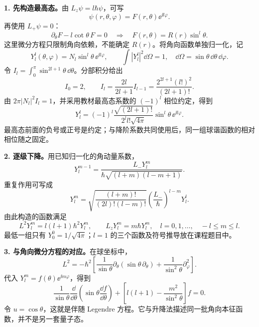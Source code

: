 \textbf{1. 先构造最高态。}由 $L_z\psi=l\hbar\psi$，可写
\begin{equation}
  \psi(r,\theta,\varphi)=F(r,\theta)\ee^{\ii l\varphi}.
\end{equation}
再使用 $L_+\psi=0$：
\begin{equation}
  \partial_\theta F-l\cot\theta\,F=0
  \quad\Longrightarrow\quad F(r,\theta)=R(r)\sin^l\theta.
\end{equation}
这里微分方程只限制角向依赖，不能确定 $R(r)$。将角向函数单独归一化，记
\begin{equation}
  Y_l^l(\theta,\varphi)=N_l\sin^l\theta\,\ee^{\ii l\varphi},
  \qquad \int |Y_l^l|^2\dd\Omega=1,
  \quad \dd\Omega=\sin\theta\,\dd\theta\,\dd\varphi.
\end{equation}
令 $I_l=\int_0^\pi\sin^{2l+1}\theta\,\dd\theta$。分部积分给出
\begin{equation}
  I_0=2,\qquad I_l=\frac{2l}{2l+1}I_{l-1}
    =\frac{2^{2l+1}(l!)^2}{(2l+1)!}.
\end{equation}
由 $2\pi|N_l|^2I_l=1$，并采用教材最高态系数的 $(-1)^l$ 相位约定，得到
\begin{equation}
  \boxed{Y_l^l
    =(-1)^l\frac{\sqrt{(2l+1)!}}{2^l l!\sqrt{4\pi}}
       \sin^l\theta\,\ee^{\ii l\varphi}.}
\end{equation}
最高态前面的负号或正号是约定；与降阶系数共同使用后，同一组球谐函数的相对相位随之固定。

\textbf{2. 逐级下降。}用已知归一化的角动量系数，
\begin{equation}
  Y_l^{m-1}
    =\frac{L_-Y_l^m}{\hbar\sqrt{(l+m)(l-m+1)}}.
\end{equation}
重复作用可写成
\begin{equation}
  \boxed{Y_l^m
    =\sqrt{\frac{(l+m)!}{(2l)!(l-m)!}}
       \left(\frac{L_-}{\hbar}\right)^{l-m}Y_l^l.}
\end{equation}
由此构造的函数满足
\begin{equation}
  L^2Y_l^m=l(l+1)\hbar^2Y_l^m,\qquad
  L_zY_l^m=m\hbar Y_l^m,
  \quad l=0,1,\ldots,\quad -l\leq m\leq l.
\end{equation}
最低一组只有 $Y_0^0=1/\sqrt{4\pi}$；$l=1$ 的三个函数及符号推导放在课程题目中。

\textbf{3. 与角向微分方程的对应。}在球坐标中，
\begin{equation}
  \boxed{L^2=-\hbar^2\left[
    \frac1{\sin\theta}\partial_\theta(\sin\theta\,\partial_\theta)
    +\frac1{\sin^2\theta}\partial_\varphi^2\right].}
\end{equation}
代入 $Y_l^m=f(\theta)\ee^{\ii m\varphi}$，得到
\begin{equation}
  \frac1{\sin\theta}\frac{\dd}{\dd\theta}
    \left(\sin\theta\frac{\dd f}{\dd\theta}\right)
   +\left[l(l+1)-\frac{m^2}{\sin^2\theta}\right]f=0.
\end{equation}
令 $u=\cos\theta$，这就是伴随 Legendre 方程。它与升降法描述同一批角向本征函数，并不是另一套量子态。

